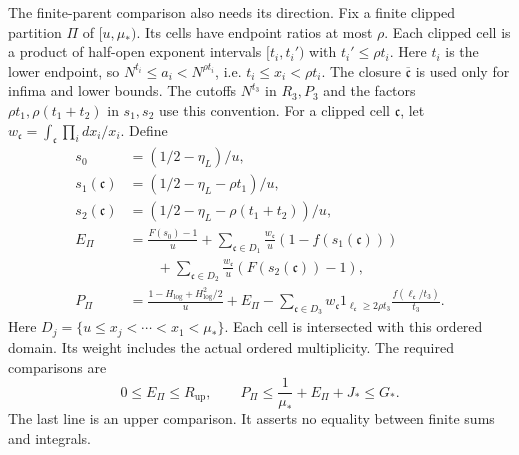 The finite-parent comparison also needs its direction.
Fix a finite clipped partition \(\Pi\) of \([u,\mu_*)\).
Its cells have endpoint ratios at most \(\rho\).
Each clipped cell is a product of half-open exponent intervals \([t_i,t_i')\) with \(t_i'\le\rho t_i\). Here \(t_i\) is the lower endpoint, so \(N^{t_i}\le a_i<N^{\rho t_i}\), i.e. \(t_i\le x_i<\rho t_i\). The closure \(\overline{\mathfrak c}\) is used only for infima and lower bounds. The cutoffs \(N^{t_3}\) in \(R_3,P_3\) and the factors \(\rho t_1,\rho(t_1+t_2)\) in \(s_1,s_2\) use this convention.
For a clipped cell \(\mathfrak c\), let
\(w_{\mathfrak c}=\int_{\mathfrak c}\prod_i dx_i/x_i\).
Define
\begin{equation}\label{eq:k2-parent-functional}
\begin{aligned}
 s_0&=(1/2-\eta_L)/u,\\
 s_1(\mathfrak c)&=(1/2-\eta_L-\rho t_1)/u,\\
 s_2(\mathfrak c)&=(1/2-\eta_L-\rho(t_1+t_2))/u,\\
 E_\Pi&=\frac{F(s_0)-1}{u}
 +\sum_{\mathfrak c\in D_1}\frac{w_{\mathfrak c}}u(1-f(s_1(\mathfrak c)))\\
 &\qquad+\sum_{\mathfrak c\in D_2}\frac{w_{\mathfrak c}}u(F(s_2(\mathfrak c))-1),\\
 P_\Pi&=\frac{1-H_{\log}+H_{\log}^2/2}{u}+E_\Pi
 -\sum_{\mathfrak c\in D_3}
    w_{\mathfrak c}1_{\ell_{\mathfrak c}\ge2\rho t_3}
             \frac{f(\ell_{\mathfrak c}/t_3)}{t_3}.
\end{aligned}
\end{equation}
Here \(D_j=\{u\le x_j<\cdots<x_1<\mu_*\}\).
Each cell is intersected with this ordered domain.
Its weight includes the actual ordered multiplicity.
The required comparisons are
\begin{equation}\label{eq:k2-parent-comparison}
 0\le E_\Pi\le R_{\mathrm{up}},\qquad
 P_\Pi\le\frac1{\mu_*}+E_\Pi+J_*\le G_*.
\end{equation}
The last line is an upper comparison.
It asserts no equality between finite sums and integrals.

